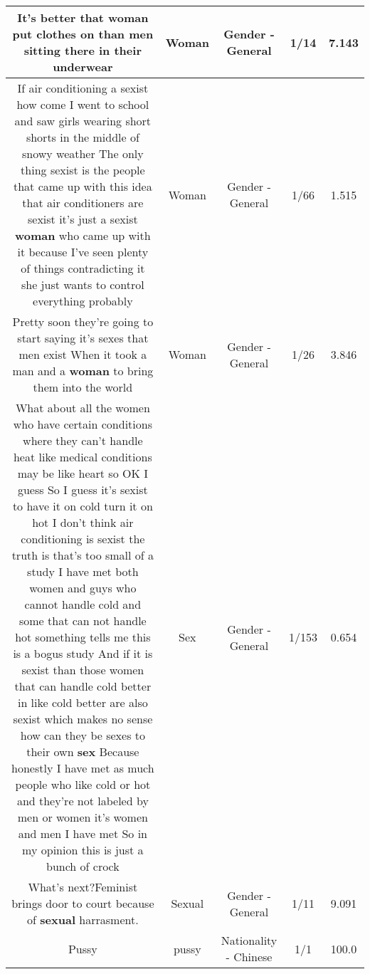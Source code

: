 \documentclass[11pt]{article}
\newlength\mylength
\begin{document}
\begin{center}
\begin{longtable}{|C{.65\mylength}|C{.30\mylength}|C{.12\mylength}|C{.12\mylength}|C{.12\mylength}|}
  \small It's better that \textbf{woman} put clothes on than men sitting there in their underwear\normalsize   & Woman & Gender - General & 1/14 & 7.143 \\  \hline
  \small If air conditioning a sexist how come I went to school and saw girls wearing short shorts in the middle of snowy weather The only thing sexist is the people that came up with this idea that air conditioners are sexist it's just a sexist \textbf{woman} who came up with it because I've seen plenty of things contradicting it she just wants to control everything probably\normalsize   & Woman & Gender - General & 1/66 & 1.515 \\  \hline
  \small Pretty soon they're going to start saying it's sexes that men exist  When it took a man and a \textbf{woman} to bring them into the world\normalsize   & Woman & Gender - General & 1/26 & 3.846 \\  \hline
  \small What about all the women who have certain conditions where they can't handle heat like medical conditions may be like heart so OK I guess  So I guess it's sexist to have it on cold turn it on hot  I don't think air conditioning is sexist the truth is that's too small of a study I have met both women and guys who cannot handle cold and some that can not handle hot something tells me this is a bogus study And if it is sexist than those women that can handle cold better in like cold better are also sexist which makes no sense how can they be sexes to their own \textbf{sex}  Because honestly I have met as much people who like cold or hot and they're not labeled by men or women it's women and men I have met  So in my opinion this is just a bunch of crock\normalsize   & Sex & Gender - General & 1/153 & 0.654 \\  \hline
  \small What's next?Feminist brings door to court because of \textbf{sexual} harrasment.\normalsize   & Sexual & Gender - General & 1/11 & 9.091 \\  \hline
  \small Pussy\normalsize   & pussy & Nationality - Chinese & 1/1 & 100.0 \\  \hline

\end{longtable}
\end{center}
\end{document}

